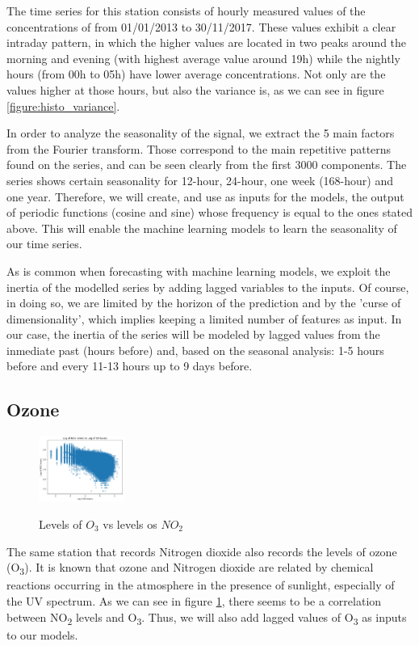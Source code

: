 \documentclass[a4paper,twocolumn,5p]{elsarticle}
\begin{document}
The time series for this station consists of hourly measured values of
the concentrations of \no from 01/01/2013 to
30/11/2017. These values exhibit a clear intraday pattern, in which
the higher values are located in two peaks around the morning and
evening (with highest average value around 19h) while the nightly
hours (from 00h to 05h) have lower average concentrations.  Not only
are the values higher at those hours, but also the variance is, as we
can see in figure \ref{figure:histo_variance}.
 
In order to analyze the seasonality of the signal, we extract the 5
main factors from the Fourier transform. Those correspond to the main
repetitive patterns found on the series, and can be seen clearly from
the first 3000 components. The series shows certain seasonality for
12-hour, 24-hour, one week (168-hour) and one year.  Therefore, we will
create, and use as inputs for the models, the output of periodic
functions (cosine and sine) whose frequency is equal to the ones
stated above. This will enable the machine learning models to learn
the seasonality of our time series.

As is common when forecasting with machine learning models, we exploit
the inertia of the modelled series by adding lagged variables to the
inputs. Of course, in doing so, we are limited by the horizon of the
prediction and by the 'curse of dimensionality', which implies keeping
a limited number of features as input. In our case, the inertia of the
series will be modeled by lagged values from the inmediate past (hours
before) and, based on the seasonal analysis: 1-5 hours before and
every 11-13 hours up to 9 days before.

\subsection{Ozone}

\begin{figure}
  \centering
  \includegraphics[width=0.25\textwidth]{no2vso3}
  \label{figure:no2vso3}
  \caption{Levels of $O_3$ vs levels os $NO_2$}
\end{figure}

The same station that records Nitrogen dioxide also records the levels
of ozone (O\textsubscript{3}). It is known that ozone and Nitrogen
dioxide are related by chemical reactions occurring in the atmosphere
in the presence of sunlight, especially of the UV spectrum.  As we can
see in figure \ref{figure:no2vso3}, there seems to be a correlation
between NO\textsubscript{2} levels and O\textsubscript{3}. Thus, we
will also add lagged values of O\textsubscript{3} as inputs to our
models.
\end{document}
